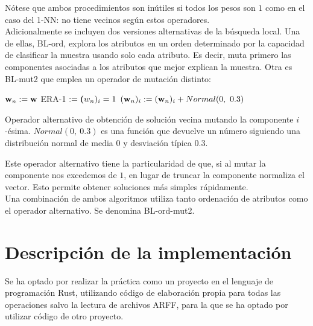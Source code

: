 \documentclass{article}
\newenvironment{algo}{
	\vspace*{0.5cm}
	\begin{algorithm}[H]}{
	\end{algorithm}
	\vspace*{0.5cm}
}
\begin{document}
Nótese que ambos procedimientos son inútiles si todos los pesos son $1$ como en el caso del 1-NN: no tiene vecinos según estos operadores. \\

Adicionalmente se incluyen dos versiones alternativas de la búsqueda local. Una de ellas, BL-ord, explora los atributos en un orden determinado por la capacidad de clasificar la muestra usando solo cada atributo. Es decir, muta primero las componentes asociadas a los atributos que mejor explican la muestra. Otra es BL-mut2 que emplea un operador de mutación distinto:

\begin{algo}
	$\normalfont \textbf w_n := \normalfont \textbf w$\;
	ERA-1 $:= \normalfont \textbf (w_n)_i = 1$\;
	$(\normalfont \textbf w_n)_i := (\normalfont \textbf w_n)_i + Normal(0,\ 0.3)$\;
	\vspace{0.2cm}
	\caption{Operador alternativo de obtención de solución vecina mutando la componente $i$-ésima. $Normal(0,\ 0.3)$ es una función que devuelve un número siguiendo una distribución normal de media $0$ y desviación típica $0.3$.}
\end{algo}

Este operador alternativo tiene la particularidad de que, si al mutar la componente nos excedemos de $1$, en lugar de truncar la componente normaliza el vector. Esto permite obtener soluciones más simples rápidamente. \\

Una combinación de ambos algoritmos utiliza tanto ordenación de atributos como el operador alternativo. Se denomina BL-ord-mut2.

\section{Descripción de la implementación}

Se ha optado por realizar la práctica como un proyecto en el lenguaje de programación Rust, utilizando código de elaboración propia para todas las operaciones salvo la lectura de archivos ARFF, para la que se ha optado por utilizar código de otro proyecto. \\
\end{document}
